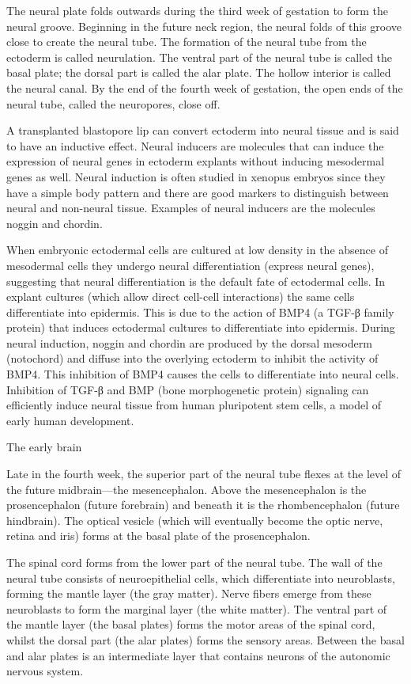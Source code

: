 The neural plate folds outwards during the third week of gestation to form the neural groove. Beginning in the future neck region, the neural folds of this groove close to create the neural tube. The formation of the neural tube from the ectoderm is called neurulation. The ventral part of the neural tube is called the basal plate; the dorsal part is called the alar plate. The hollow interior is called the neural canal. By the end of the fourth week of gestation, the open ends of the neural tube, called the neuropores, close off.

A transplanted blastopore lip can convert ectoderm into neural tissue and is said to have an inductive effect. Neural inducers are molecules that can induce the expression of neural genes in ectoderm explants without inducing mesodermal genes as well. Neural induction is often studied in xenopus embryos since they have a simple body pattern and there are good markers to distinguish between neural and non-neural tissue. Examples of neural inducers are the molecules noggin and chordin.

When embryonic ectodermal cells are cultured at low density in the absence of mesodermal cells they undergo neural differentiation (express neural genes), suggesting that neural differentiation is the default fate of ectodermal cells. In explant cultures (which allow direct cell-cell interactions) the same cells differentiate into epidermis. This is due to the action of BMP4 (a TGF-β family protein) that induces ectodermal cultures to differentiate into epidermis. During neural induction, noggin and chordin are produced by the dorsal mesoderm (notochord) and diffuse into the overlying ectoderm to inhibit the activity of BMP4. This inhibition of BMP4 causes the cells to differentiate into neural cells. Inhibition of TGF-β and BMP (bone morphogenetic protein) signaling can efficiently induce neural tissue from human pluripotent stem cells, a model of early human development.

The early brain

Late in the fourth week, the superior part of the neural tube flexes at the level of the future midbrain---the mesencephalon. Above the mesencephalon is the prosencephalon (future forebrain) and beneath it is the rhombencephalon (future hindbrain). The optical vesicle (which will eventually become the optic nerve, retina and iris) forms at the basal plate of the prosencephalon.

The spinal cord forms from the lower part of the neural tube. The wall of the neural tube consists of neuroepithelial cells, which differentiate into neuroblasts, forming the mantle layer (the gray matter). Nerve fibers emerge from these neuroblasts to form the marginal layer (the white matter). The ventral part of the mantle layer (the basal plates) forms the motor areas of the spinal cord, whilst the dorsal part (the alar plates) forms the sensory areas. Between the basal and alar plates is an intermediate layer that contains neurons of the autonomic nervous system.

